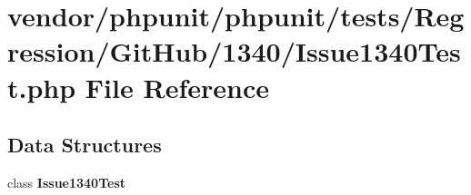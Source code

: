 \section{vendor/phpunit/phpunit/tests/\+Regression/\+Git\+Hub/1340/\+Issue1340\+Test.php File Reference}
\label{_issue1340_test_8php}
\subsection*{Data Structures}
\begin{DoxyCompactItemize}
\item 
class {\bf Issue1340\+Test}
\end{DoxyCompactItemize}
